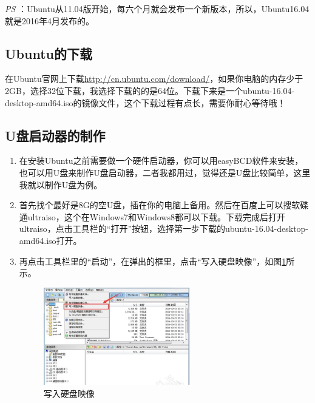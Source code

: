 \documentclass{article}
\begin{document}
\textsl{PS} ：Ubuntu从11.04版开始，每六个月就会发布一个新版本，所以，Ubuntu16.04就是2016年4月发布的。

\subsection{Ubuntu的下载}

  在Ubuntu官网上下载\url{http://cn.ubuntu.com/download/}，如果你电脑的内存少于2GB，选择32位下载，我选择下载的的是64位。下载下来是一个ubuntu-16.04-desktop-amd64.iso的镜像文件，这个下载过程有点长，需要你耐心等待哦！

\subsection{U盘启动器的制作}
\begin{enumerate}
\item 在安装Ubuntu之前需要做一个硬件启动器，你可以用easyBCD软件来安装，也可以用U盘来制作U盘启动器，二者我都用过，觉得还是U盘比较简单，这里我就以制作U盘为例。

\item 首先找个最好是8G的空U盘，插在你的电脑上备用。然后在百度上可以搜软碟通ultraiso，这个在Windows7和Windows8都可以下载。下载完成后打开ultraiso，点击工具栏的“打开”按钮，选择第一步下载的ubuntu-16.04-desktop-amd64.iso打开。

\item 再点击工具栏里的“启动”，在弹出的框里，点击“写入硬盘映像”，如图\ref{tu1}所示。
\begin{figure}[!htb] %
\centering
\includegraphics[width=0.6\textwidth]{tu1.jpeg}
\caption{\small 写入硬盘映像}
\label{tu1}
\end{figure}  


\end{enumerate}
\end{document}

